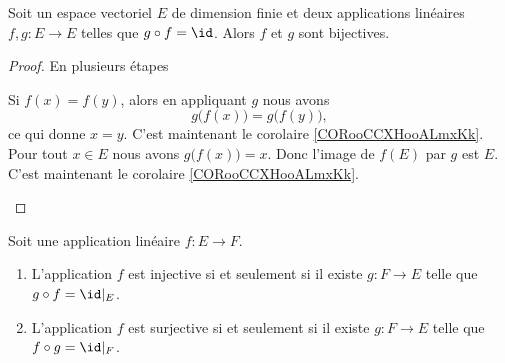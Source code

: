 \begin{proposition}     \label{PROPooADESooATJSrH}
	Soit un espace vectoriel \( E\) de dimension finie et deux applications linéaires \( f,g\colon E\to E\) telles que \( g\circ f=\id\). Alors \( f\) et \( g\) sont bijectives.
\end{proposition}

\begin{proof}
	En plusieurs étapes
	\begin{subproof}
		Si \( f(x)=f(y)\), alors en appliquant \( g\) nous avons
		\begin{equation}
			g\big( f(x) \big)=g\big( f(y) \big),
		\end{equation}
		ce qui donne \( x=y\).
		C'est maintenant le corolaire \ref{CORooCCXHooALmxKk}.
		Pour tout \( x\in E\) nous avons \( g\big( f(x) \big)=x\). Donc l'image de \( f(E)\) par \( g\) est \( E\).
		C'est maintenant le corolaire \ref{CORooCCXHooALmxKk}.
	\end{subproof}
\end{proof}

\begin{lemma}        \label{LEMooDAACooElDsYb}
	Soit une application linéaire \( f\colon E\to F\).
	\begin{enumerate}
		\item       \label{ITEMooEZEWooZGoqsZ}
		      L'application \( f\) est injective si et seulement si il existe \( g\colon F\to E\) telle que \( g\circ f=\id|_E\).
		\item
		      L'application \( f\) est surjective si et seulement si il existe \( g\colon F\to E\) telle que \( f\circ g=\id|_F\).
	\end{enumerate}
\end{lemma}

